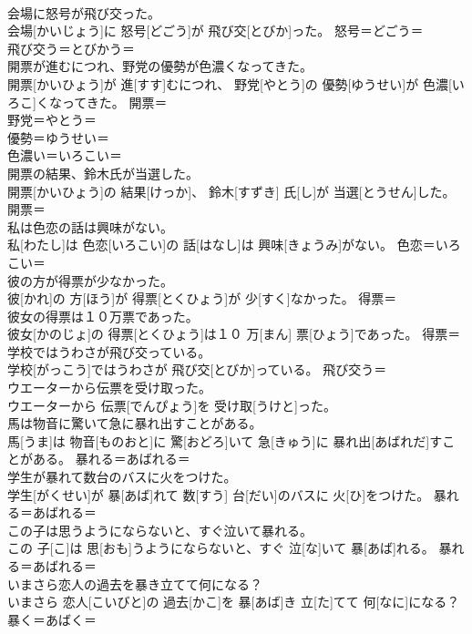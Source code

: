 \documentclass[8pt]{extreport}
\begin{document}
\begin{CJK}{UTF8}{min}
\\	会場に怒号が飛び交った。	
\\	会場[かいじょう]に 怒号[どごう]が 飛び交[とびか]った。	怒号＝どごう＝ 
\\	飛び交う＝とびかう＝ 
\\	開票が進むにつれ、野党の優勢が色濃くなってきた。	
\\	開票[かいひょう]が 進[すす]むにつれ、 野党[やとう]の 優勢[ゆうせい]が 色濃[いろこ]くなってきた。	開票＝ 
\\	野党＝やとう＝ 
\\	優勢＝ゆうせい＝ 
\\	色濃い＝いろこい＝ 
\\	開票の結果、鈴木氏が当選した。	
\\	開票[かいひょう]の 結果[けっか]、 鈴木[すずき] 氏[し]が 当選[とうせん]した。	開票＝ 
\\	私は色恋の話は興味がない。	
\\	私[わたし]は 色恋[いろこい]の 話[はなし]は 興味[きょうみ]がない。	色恋＝いろこい＝ 
\\	彼の方が得票が少なかった。	
\\	彼[かれ]の 方[ほう]が 得票[とくひょう]が 少[すく]なかった。	得票＝ 
\\	彼女の得票は１０万票であった。	
\\	彼女[かのじょ]の 得票[とくひょう]は１０ 万[まん] 票[ひょう]であった。	得票＝ 
\\	学校ではうわさが飛び交っている。	
\\	学校[がっこう]ではうわさが 飛び交[とびか]っている。	飛び交う＝ 
\\	ウエーターから伝票を受け取った。	
\\	ウエーターから 伝票[でんぴょう]を 受け取[うけと]った。	
\\	馬は物音に驚いて急に暴れ出すことがある。	
\\	馬[うま]は 物音[ものおと]に 驚[おどろ]いて 急[きゅう]に 暴れ出[あばれだ]すことがある。	暴れる＝あばれる＝ 
\\	学生が暴れて数台のバスに火をつけた。	
\\	学生[がくせい]が 暴[あば]れて 数[すう] 台[だい]のバスに 火[ひ]をつけた。	暴れる＝あばれる＝ 
\\	この子は思うようにならないと、すぐ泣いて暴れる。	
\\	この 子[こ]は 思[おも]うようにならないと、すぐ 泣[な]いて 暴[あば]れる。	暴れる＝あばれる＝ 
\\	いまさら恋人の過去を暴き立てて何になる？	
\\	いまさら 恋人[こいびと]の 過去[かこ]を 暴[あば]き 立[た]てて 何[なに]になる？	暴く＝あばく＝ 

\end{CJK}
\end{document}
